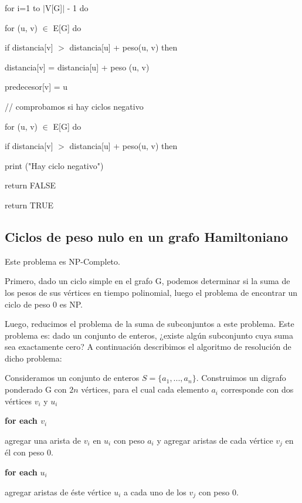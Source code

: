 \documentclass[a4paper,10pt]{article}
\begin{document}
\quad for i=1 to \(|\)V[G]\(|\) - 1 do
       
\quad\quad for (u, v) \(\in\)  E[G] do
       
\quad\quad\quad if distancia[v] \(>\) distancia[u] + peso(u, v) then
       
\quad\quad\quad\quad distancia[v] = distancia[u] + peso (u, v)
       
\quad\quad\quad\quad predecesor[v] = u

\bigskip       
\quad // comprobamos si hay ciclos negativo
       
\quad for (u, v) \(\in\) E[G] do
       
\quad\quad if distancia[v] \(>\) distancia[u] + peso(u, v) then
       
\quad\quad\quad print ("Hay ciclo negativo")
       
\quad\quad\quad return FALSE

\bigskip       
\quad return TRUE


\subsection{Ciclos de peso nulo en un grafo Hamiltoniano}

Este problema es NP-Completo.
 
Primero, dado un ciclo simple en el grafo G, podemos determinar si la suma de los pesos de sus vértices en tiempo polinomial, luego el problema de encontrar un ciclo de peso 0 es NP.

Luego, reducimos el problema de la suma de subconjuntos a este problema. Este problema es: dado un conjunto de enteros, ¿existe algún subconjunto cuya suma sea exactamente cero? A continuación describimos el algoritmo de resolución de dicho problema:

\bigskip

Consideramos un conjunto de enteros \( S = \{ a_{1}, . . . , a_{n} \}  \). Construimos un digrafo ponderado G con \( 2n \) vértices, para el cual cada elemento \( a_{i} \) corresponde con dos vértices \( v_{i} \) y \( u_{i} \)

\textbf{\textcolor[rgb]{0.0,0.5019608,0.0}{for each }}\( v_{i} \)

\quad agregar una arista de \( v_{i} \) en \( u_{i} \) con peso \( a_{i} \) y agregar aristas de cada vértice \( v_{j} \) en él con peso 0.

\textbf{\textcolor[rgb]{0.0,0.5019608,0.0}{for each}} \( u_{i} \)

\quad agregar aristas de éste vértice \( u_{i} \) a cada uno de los \( v_{j} \) con peso 0. 
\end{document}

